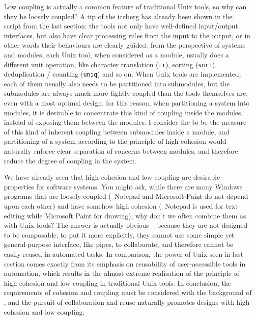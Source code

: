 Low coupling is actually a common feature of traditional Unix tools, so why can
they be loosely coupled?  A tip of the iceberg has already been shown in the
script from the last section: the tools not only have well-defined input/output
interfaces, but also have clear processing rules from the input to the output,
or in other words their behaviours are clearly guided; from the perspective of
systems and modules, each Unix tool, when considered as a module, usually does
a different unit operation, like character translation (\verb|tr|), sorting
(\verb|sort|), deduplication / counting (\verb|uniq|) and so on.  When Unix
tools are implemented, each of them usually also needs to be partitioned into
submodules, but the submodules are always much more tightly coupled than the
tools themselves are, even with a most optimal design; for this reason, when
partitioning a system into modules, it is desirable to concentrate this kind
of coupling inside the modules, instead of exposing them between the modules.
I consider the  to be the measure of this
kind of inherent coupling between submodules inside a module, and
partitioning of a system according to the principle of high cohesion
would naturally enforce clear separation of concerns between modules,
and therefore reduce the degree of coupling in the system.

We have already seen that high cohesion and low coupling are desirable
properties for software systems.  You might ask, while there are many Windows
programs that are loosely coupled (\eg~Notepad and Microsoft Paint do not
depend upon each other) and have somehow high cohesion (\eg~Notepad is used
for text editing while Microsoft Paint for drawing), why don't we often combine
them as with Unix tools?  The answer is actually obvious -- because they are
not designed to be composable; to put it more explicitly, they cannot use some
simple yet general-purpose interface, like pipes, to collaborate, and therefore
cannot be easily reused in automated tasks.  In comparison, the power of
Unix seen in last section comes exactly from its emphasis on reusability of
user-accessible tools in automation, which results in the almost extreme
realisation of the principle of high cohesion and low coupling in traditional
Unix tools.  In conclusion, the requirements of cohesion
and coupling must be considered with the background of , and the pursuit of collaboration and reuse naturally
promotes designs with high cohesion and low coupling.

